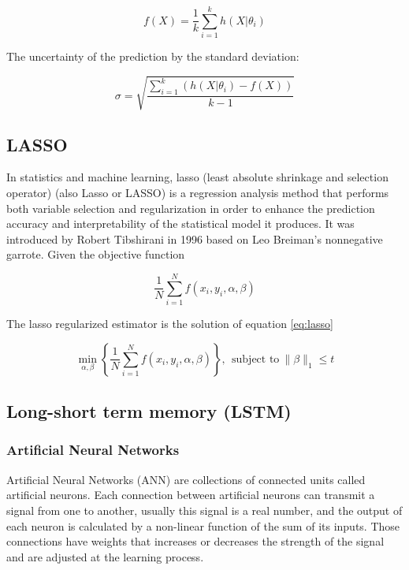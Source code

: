 \documentclass[12pt]{report}
\begin{document}
$$f(X) = \dfrac{1}{k} \sum_{i=1}^{k} h(X|\theta_i)$$

The uncertainty of the prediction by the standard deviation:

$$\sigma = \sqrt{\dfrac{\sum_{i=1}^{k} (h(X|\theta_i) - f(X))}{k-1}}$$

\subsection{LASSO}
 
 In statistics and machine learning, lasso (least absolute shrinkage and selection operator)
 (also Lasso or LASSO) is a regression analysis method that performs both variable selection and
 regularization in order to enhance the prediction accuracy and interpretability of the statistical
 model it produces. It was introduced by Robert Tibshirani in 1996 based on Leo Breiman’s
 nonnegative garrote.
Given the objective function

\begin{equation}
\dfrac{1}{N} \sum_{i=1}^{N} f(x_i,y_i,\alpha,\beta)
\end{equation}
 
The lasso regularized estimator is the solution of equation \ref{eq:lasso}

\begin{equation}
\min_{\alpha, \beta} \left \{ \dfrac{1}{N} \sum_{i=1}^{N} f(x_i,y_i,\alpha,\beta)  \right \}, \ \ \text{subject to} \ \| \beta \|_{1} \leq t 
\label{eq:lasso}
\end{equation}

\subsection{Long-short term memory (LSTM)}

\subsubsection{Artificial Neural Networks}

Artificial Neural Networks (ANN) are collections of connected units called artificial neurons. Each connection between artificial neurons can transmit a signal from one to another, usually this signal is a real number, and the output of each neuron is calculated by a non-linear function of the sum of its inputs.
Those connections have weights that increases or decreases the strength of the signal and are adjusted at the learning process. 
\end{document}
